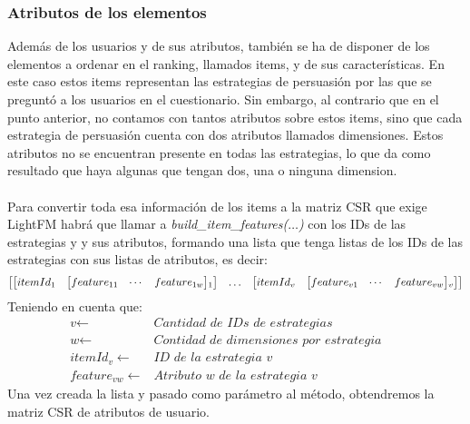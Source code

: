 \subsubsection{Atributos de los elementos}
Además de los usuarios y de sus atributos, también se ha de disponer de los elementos a ordenar en el ranking, llamados items, y de sus características. En este caso estos items representan las estrategias de persuasión por las que se preguntó a los usuarios en el cuestionario. Sin embargo, al contrario que en el punto anterior, no contamos con tantos atributos sobre estos items, sino que cada estrategia de persuasión cuenta con dos atributos llamados dimensiones. Estos atributos no se encuentran presente en todas las estrategias, lo que da como resultado que haya algunas que tengan dos, una o ninguna dimension.
\\ \\
Para convertir toda esa información de los items a la matriz CSR que exige LightFM habrá que llamar a \textit{build\_item\_features($\ldots$)} con los IDs de las estrategias y y sus atributos, formando una lista que tenga listas de los IDs de las estrategias con sus listas de atributos, es decir:
\begin{align*}
    \begin{bmatrix}
        \begin{bmatrix} 
            itemId$$_{1}$$ & \begin{bmatrix} feature$$_{11}$$ &\cdots & feature$$_{1w}$$ \end{bmatrix}$$_1$$
        \end{bmatrix}
        &
        \ldots
        &
        \begin{bmatrix} 
            itemId$$_{v}$$ & \begin{bmatrix} feature$$_{v1}$$ &\cdots & feature$$_{vw}$$ \end{bmatrix}$$_v$$
        \end{bmatrix}
    \end{bmatrix}
\end{align*}
Teniendo en cuenta que:
\begin{align*}
    \textit{v}\gets & \textit{Cantidad de IDs de estrategias }
    &&\\
    \textit{w} \gets & \textit{Contidad de dimensiones por estrategia}
    &&\\
    \textit{itemId$_{v}$} \gets & \textit{ID de la estrategia v}
    &&\\
    \textit{feature$_{vw}$} \gets & \textit{Atributo w de la estrategia v}
\end{align*}
%
Una vez creada la lista y pasado como parámetro al método, obtendremos la matriz CSR de atributos de usuario.
%
%
